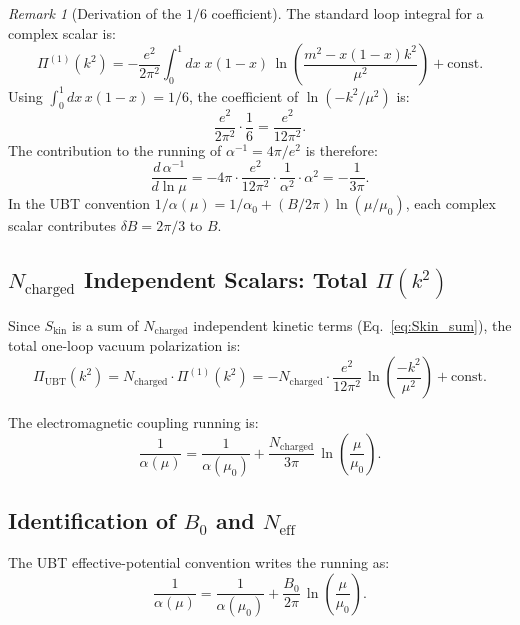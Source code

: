\documentclass[11pt,a4paper]{article}
\theoremstyle{remark}
\newtheorem{remark}{Remark}
\begin{document}
\begin{remark}[Derivation of the $1/6$ coefficient]
The standard loop integral for a complex scalar is:
\begin{equation}
  \Pi^{(1)}(k^2) = -\frac{e^2}{2\pi^2}\int_0^1 dx\;x(1-x)\,
  \ln\!\left(\frac{m^2 - x(1-x)k^2}{\mu^2}\right) + \text{const.}
\end{equation}
Using $\int_0^1 dx\,x(1-x) = 1/6$, the coefficient of $\ln(-k^2/\mu^2)$ is:
\begin{equation}
  \frac{e^2}{2\pi^2} \cdot \frac{1}{6} = \frac{e^2}{12\pi^2}.
\end{equation}
The contribution to the running of $\alpha^{-1} = 4\pi/e^2$ is therefore:
\begin{equation}
  \frac{d\,\alpha^{-1}}{d\ln\mu}
  = -4\pi \cdot \frac{e^2}{12\pi^2} \cdot \frac{1}{\alpha^2}\cdot\alpha^2
  = -\frac{1}{3\pi}.
\end{equation}
In the UBT convention $1/\alpha(\mu) = 1/\alpha_0 + (B/2\pi)\ln(\mu/\mu_0)$, each complex
scalar contributes $\delta B = 2\pi/3$ to $B$.
\end{remark}

\subsection{$N_{\mathrm{charged}}$ Independent Scalars: Total $\Pi(k^2)$}

Since $S_{\mathrm{kin}}$ is a sum of $N_{\mathrm{charged}}$ independent kinetic terms
(Eq.~\eqref{eq:Skin_sum}), the total one-loop vacuum polarization is:
\begin{equation}
  \Pi_{\mathrm{UBT}}(k^2)
  = N_{\mathrm{charged}} \cdot \Pi^{(1)}(k^2)
  = -N_{\mathrm{charged}} \cdot \frac{e^2}{12\pi^2}\,\ln\!\left(\frac{-k^2}{\mu^2}\right)
    + \text{const.}
  \label{eq:Pi_UBT}
\end{equation}

The electromagnetic coupling running is:
\begin{equation}
  \frac{1}{\alpha(\mu)} = \frac{1}{\alpha(\mu_0)}
    + \frac{N_{\mathrm{charged}}}{3\pi}\,\ln\!\left(\frac{\mu}{\mu_0}\right).
  \label{eq:alpha_running}
\end{equation}

\subsection{Identification of $B_0$ and $N_{\mathrm{eff}}$}

The UBT effective-potential convention writes the running as:
\begin{equation}
  \frac{1}{\alpha(\mu)} = \frac{1}{\alpha(\mu_0)}
    + \frac{B_0}{2\pi}\,\ln\!\left(\frac{\mu}{\mu_0}\right).
  \label{eq:ubt_running}
\end{equation}
\end{document}
